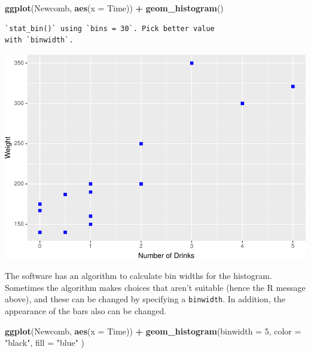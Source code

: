 \documentclass[]{krantz}
\makeatletter
\newenvironment{Shaded}{\begin{snugshade}}{\end{snugshade}}
\newcommand{\DataTypeTok}[1]{\textcolor[rgb]{0.27,0.27,0.27}{#1}}
\newcommand{\DecValTok}[1]{\textcolor[rgb]{0.06,0.06,0.06}{#1}}
\newcommand{\KeywordTok}[1]{\textcolor[rgb]{0.27,0.27,0.27}{\textbf{#1}}}
\newcommand{\NormalTok}[1]{#1}
\newcommand{\OperatorTok}[1]{\textcolor[rgb]{0.43,0.43,0.43}{\textbf{#1}}}
\newcommand{\StringTok}[1]{\textcolor[rgb]{0.5,0.5,0.5}{#1}}
\newenvironment{kframe}{%
\medskip{}
\setlength{\fboxsep}{.8em}
 \def\at@end@of@kframe{}%
 \ifinner\ifhmode%
  \def\at@end@of@kframe{\end{minipage}}%
  \begin{minipage}{\columnwidth}%
 \fi\fi%
 \def\FrameCommand##1{\hskip\@totalleftmargin \hskip-\fboxsep
 \colorbox{shadecolor}{##1}\hskip-\fboxsep
     \hskip-\linewidth \hskip-\@totalleftmargin \hskip\columnwidth}%
 \MakeFramed {\advance\hsize-\width
   \@totalleftmargin\z@ \linewidth\hsize
   \@setminipage}}%
 {\par\unskip\endMakeFramed%
 \at@end@of@kframe}
\renewenvironment{Shaded}{\begin{kframe}}{\end{kframe}}
\makeatother
\begin{document}
\begin{Shaded}
\begin{Highlighting}[]
\KeywordTok{ggplot}\NormalTok{(Newcomb, }\KeywordTok{aes}\NormalTok{(}\DataTypeTok{x =}\NormalTok{ Time)) }\OperatorTok{+}\StringTok{ }\KeywordTok{geom_histogram}\NormalTok{()}
\end{Highlighting}
\end{Shaded}

\begin{verbatim}
`stat_bin()` using `bins = 30`. Pick better value
with `binwidth`.
\end{verbatim}

\includegraphics{bookdown_files/figure-latex/unnamed-chunk-73-1.pdf}

The software has an algorithm to calculate bin widths for the histogram. Sometimes the algorithm makes choices that aren't suitable (hence the R message above), and these can be changed by specifying a \texttt{binwidth}. In addition, the appearance of the bars also can be changed.

\begin{Shaded}
\begin{Highlighting}[]
\KeywordTok{ggplot}\NormalTok{(Newcomb, }\KeywordTok{aes}\NormalTok{(}\DataTypeTok{x =}\NormalTok{ Time)) }\OperatorTok{+}\StringTok{ }
\StringTok{    }\KeywordTok{geom_histogram}\NormalTok{(}\DataTypeTok{binwidth =} \DecValTok{5}\NormalTok{, }\DataTypeTok{color =} \StringTok{"black"}\NormalTok{, }\DataTypeTok{fill =} \StringTok{"blue"}\NormalTok{ )}
\end{Highlighting}
\end{Shaded}
\end{document}
